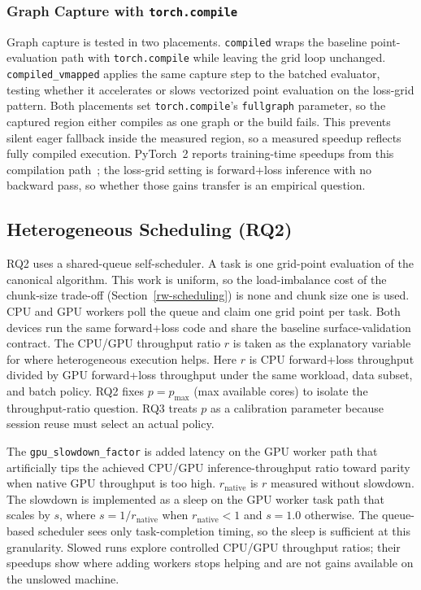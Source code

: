 \subsubsection{\texorpdfstring{Graph Capture with
\texttt{torch.compile}}{Graph Capture with torch.compile}}\label{graph-capture-with-torch.compile}

Graph capture is tested in two placements.
\texttt{compiled} wraps the baseline point-evaluation path
with \texttt{torch.compile} while leaving the grid loop
unchanged. \texttt{compiled\_vmapped} applies the same capture
step to the batched evaluator, testing whether it accelerates
or slows vectorized point evaluation on the
loss-grid pattern. Both placements set
\texttt{torch.compile}'s \texttt{fullgraph} parameter, so the
captured region either compiles as one graph or the build
fails. This prevents silent eager fallback inside the
measured region, so a measured speedup reflects fully compiled
execution. PyTorch~2 reports training-time speedups
from this compilation path~\cite{ansel2024pytorch2}; the
loss-grid setting is forward+loss inference with no backward
pass, so whether those gains transfer is an empirical question.

\subsection{Heterogeneous Scheduling
(RQ2)}\label{methods-scheduling}

RQ2 uses a shared-queue self-scheduler. A task is one
grid-point evaluation of the canonical algorithm.
This work is uniform, so the load-imbalance cost of
the chunk-size trade-off (Section~\ref{rw-scheduling}) is
none and chunk size one is used.
CPU and GPU workers poll the queue and claim one grid point
per task. Both devices run the same forward+loss code
and share the baseline surface-validation contract. The CPU/GPU
throughput ratio $r$ is taken as the explanatory variable for
where heterogeneous execution helps. Here $r$ is CPU
forward+loss throughput divided by GPU forward+loss throughput
under the same workload, data subset, and batch policy. RQ2
fixes $p=p_{\max}$ (max available cores) to isolate the throughput-ratio question.
RQ3 treats $p$ as a calibration parameter because session reuse
must select an actual policy.

The \texttt{gpu\_slowdown\_factor} is added latency on the
GPU worker path that artificially tips the achieved CPU/GPU
inference-throughput ratio toward parity when native GPU
throughput is too high.
$r_{\text{native}}$ is $r$ measured without slowdown. The
slowdown is implemented as a sleep on the GPU worker task
path that scales by $s$, where $s=1/r_{\text{native}}$ when
$r_{\text{native}}<1$ and $s=1.0$ otherwise. The
queue-based scheduler sees only task-completion timing, so
the sleep is sufficient at this granularity. Slowed runs
explore controlled CPU/GPU throughput ratios; their speedups
show where adding workers stops helping and are not gains
available on the unslowed machine.

